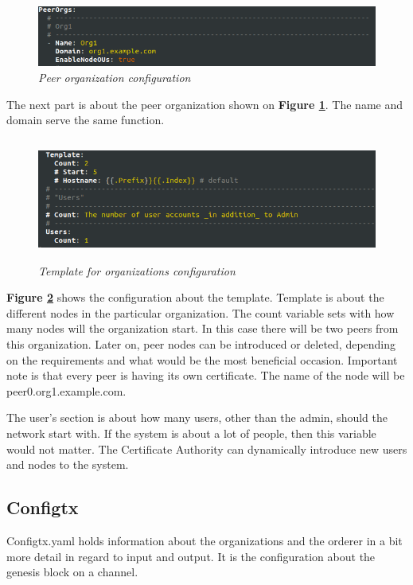 \documentclass[a4paper,11pt]{report}
\begin{document}
\begin{figure}[h]
\centering
  \includegraphics[width = 16cm]{cryptoconfig2.png}
  \caption{\textit{Peer organization configuration}}
  \label{cryptoconfig2}
\end{figure}

The next part is about the peer organization shown on \textbf{Figure \ref{cryptoconfig2}}. The name and domain serve the same function. 

\begin{figure}[h]
\centering
  \includegraphics[height = 4cm,width = 16cm]{cryptoconfig3.png}
  \caption{ \textit{Template for organizations configuration} }
  \label{cryptoconfig3}
\end{figure}

\textbf{Figure \ref{cryptoconfig3}} shows the configuration about the template. Template is about the different nodes in the particular organization. The count variable sets with how many nodes will the organization start. In this case there will be two peers from this organization. Later on, peer nodes can be introduced or deleted, depending on the requirements and what would be the most beneficial occasion. Important note is that every peer is having its own certificate. The name of the node will be peer0.org1.example.com. 

The user's section is about how many users, other than the admin, should the network start with. If the system is about a lot of people, then this variable would not matter. The Certificate Authority can dynamically introduce new users and nodes to the system. 

\subsection{Configtx}

Configtx.yaml holds information about the organizations and the orderer in a bit more detail in regard to input and output. It is the configuration about the genesis block on a channel. 
\end{document}
